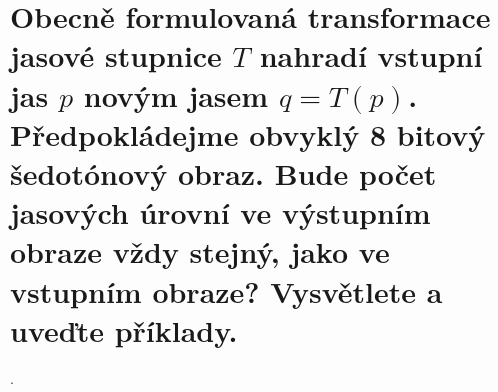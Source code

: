 \section{Obecně formulovaná transformace jasové stupnice \texorpdfstring{$T$}{T} nahradí vstupní jas 
\texorpdfstring{$p$}{p} novým jasem \texorpdfstring{$q=T(p)$}{q=T(p)}. Předpokládejme obvyklý 8 bitový šedotónový obraz. 
Bude počet jasových úrovní ve výstupním obraze vždy stejný, jako ve vstupním obraze? Vysvětlete a uveďte příklady.}.